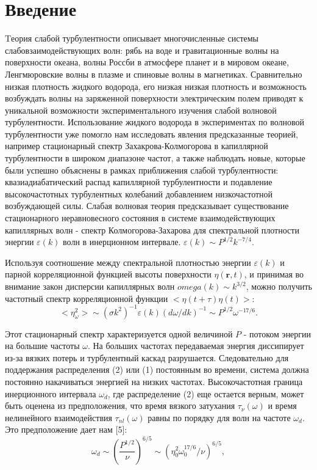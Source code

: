\section{Введение} %
Tеория слабой турбулентности описывает многочисленные системы слабовзаимодействующих волн: рябь на воде и гравитационные волны на поверхности океана, волны Россби в атмосфере планет и в мировом океане, Ленгмюровские волны в плазме и спиновые волны в магнетиках. Сравнительно низкая плотность жидкого водорода, его низкая низкая плотность и возможность возбуждать волны на заряженной поверхности электрическим полем приводят к уникальной возможности экспериментального изучения слабой волновой турбулентности. Использование жидкого водорода в экспериментах по волновой турбулентности уже помогло нам исследовать явления предсказанные теорией, например стационарный  спектр Захакрова-Колмогорова в капиллярной турбулентности в широком диапазоне частот, а также наблюдать новые, которые были успешно объяснены в рамках  приближения слабой турбулентности: квазиадиабатический распад капиллярной турбулентности и подавление высокочастотных турбулентных колебаний добавлением низкочастотной возбуждающей силы.
Слабая волновая теория предсказывает существование стационарного неравновесного состояния в системе взаимодействующих капиллярных волн - спектр Колмогорова-Захарова для спектральной плотности энергии $\varepsilon(k)$ волн в инерционном интервале.
$\varepsilon(k) \sim P^{1/2}k^{-7/4}$.

Используя соотношение между спектральной плотностью энергии $\varepsilon(k)$ и парной корреляционной функцией высоты поверхности $\eta(\mathbf{r}, t)$, и принимая во внимание закон дисперсии капиллярных волн $omega(k) \sim k^{3/2}$, можно получить частотный спектр корреляционной функции $<\eta(t+\tau)\eta(t)>$:
\begin{equation}
<\eta_\omega^2> \sim (\sigma k^2)^{-1} \varepsilon(k)(d\omega/dk)^{-1} \sim P^{1/2} \omega^{-17/6}.
\end{equation}

 

Этот стационарный спектр характеризуется одной величиной $P$ - потоком энергии на большие частоты $\omega$. На больших частотах передаваемая энергия диссипирует из-за вязких потерь и турбулентный каскад разрушается. Следовательно для поддержания распределения (2) или (1) постоянным во времени, система должна постоянно накачиваться энергией на низких частотах. Высокочастотная граница инерционного интервала $\omega_d$, где распределение (2) еще остается верным, может быть оценена из предположения, что время вязкого затухания $\tau_\nu(\omega)$ и время нелинейного взаимодействия $\tau_{nl}(\omega)$ равны по порядку для волн на частоте $\omega_d$. Это предположение дает нам [5]:
\begin{equation}
\omega_d	 \sim (\frac{P^{1/2}}{\nu})^{6/5} \sim (\eta_0^2\omega_0^{17/6}/\nu)^{6/5},
\end{equation}

